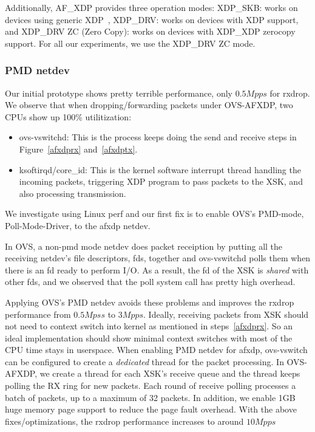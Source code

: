 \documentclass[10pt]{sigplanconf}
\newcommand{\mycomment}[1]{}
\begin{document}
Additionally, AF\_XDP provides three operation modes:
XDP\_SKB: works on devices using generic XDP~\cite{genericxdp},
XDP\_DRV: works on devices with XDP support, and
XDP\_DRV ZC (Zero Copy): works on devices with XDP\_XDP zerocopy support.
For all our experiments, we use the XDP\_DRV ZC mode.

\subsubsection{PMD netdev}
Our initial prototype shows pretty terrible performance, only $0.5Mpps$ for rxdrop.
We observe that when dropping/forwarding packets under OVS-AFXDP, two CPUs show up
100\% utilitization:
\begin{itemize}
\item ovs-vswitchd: This is the process keeps doing the send and receive steps
in Figure~\ref{afxdprx} and~\ref{afxdptx}.
\item ksoftirqd/core\_id: This is the kernel software interrupt thread handling the
incoming packets, triggering XDP program to pass packets to the XSK, and also
processing transmission.
\end{itemize}
\mycomment{Compared to xdpsock, ovs-vswitchd adds on top of it a UMEM memory pool,
and packets parsing, lookup and action execution.}
We investigate using Linux perf and our first fix is to enable OVS's PMD-mode,
Poll-Mode-Driver, to the afxdp netdev.

In OVS, a non-pmd mode netdev does packet receiption by putting all the receiving
netdev's file descriptors, fds, together and ovs-vswitchd polls them when there is an fd
ready to perform I/O.  As a result, the fd of the XSK is {\em shared} with other fds, and
we observed that the poll system call has pretty high overhead.

Applying OVS's PMD netdev avoids these problems and improves the rxdrop performance
from $0.5Mpss$ to $3Mpps$.  Ideally, receiving packets from XSK should not need to context
switch into kernel as mentioned in steps~\ref{afxdprx}. So an ideal implementation
should show minimal context switches with most of the CPU time stays in userspace. 
When enabling PMD netdev for afxdp, ovs-vswitch can be
configured to create a {\em dedicated} thread for the packet processing.
In OVS-AFXDP, we create a thread for each XSK's receive queue and the thread keeps polling
the RX ring for new packets.  Each round of receive polling processes a batch of
packets, up to a maximum of 32 packets. In addition, we enable 1GB huge memory page support
to reduce the page fault overhead.  With the above fixes/optimizations, the rxdrop
performance increases to around $10Mpps$
\end{document}
